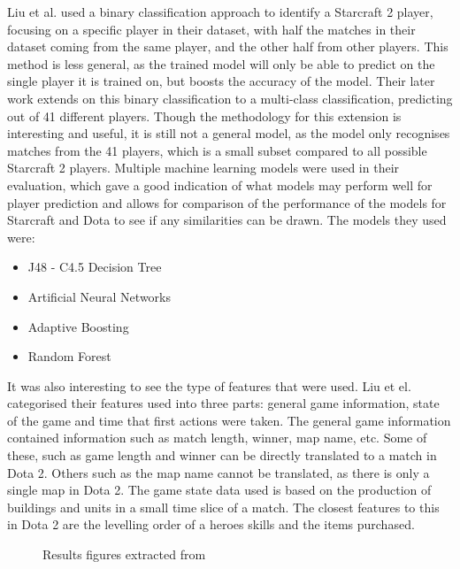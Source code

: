\documentclass[Report.tex]{subfiles}
\begin{document}
Liu et al. \cite{starcraft-identification} used a binary classification approach to identify a Starcraft 2 player, focusing on a specific player in their dataset, with half the matches in their dataset coming from the same player, and the other half from other players. This method is less general, as the trained model will only be able to predict on the single player it is trained on, but boosts the accuracy of the model. Their later work \cite{starcraft-actions} extends on this binary classification to a multi-class classification, predicting out of 41 different players. Though the methodology for this extension is interesting and useful, it is still not a general model, as the model only recognises matches from the 41 players, which is a small subset compared to all possible Starcraft 2 players. Multiple machine learning models were used in their evaluation, which gave a good indication of what models may perform well for player prediction and allows for comparison of the performance of the models for Starcraft and Dota to see if any similarities can be drawn. The models they used were:
\begin{itemize}
\item J48 - C4.5 Decision Tree
\item Artificial Neural Networks
\item Adaptive Boosting
\item Random Forest
\end{itemize}
It was also interesting to see the type of features that were used. Liu et el. categorised their features used into three parts: general game information, state of the game and time that first actions were taken. The general game information contained information such as match length, winner, map name, etc. Some of these, such as game length and winner can be directly translated to a match in Dota 2. Others such as the map name cannot be translated, as there is only a single map in Dota 2. The game state data used is based on the production of buildings and units in a small time slice of a match. The closest features to this in Dota 2 are the levelling order of a heroes skills and the items purchased. 

\begin{figure}[H]
\centering
\begin{subfigure}{0.45\textwidth}
\end{subfigure}
\hspace{\fill}
\begin{subfigure}{0.45\textwidth}
\end{subfigure}
\caption{Results figures extracted from \cite{starcraft-identification}}
\end{figure}
\end{document}
